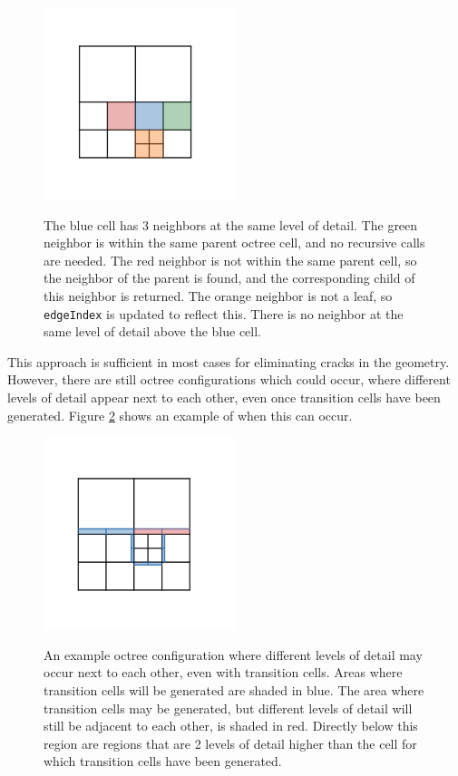 \documentclass{article}
\begin{document}
\begin{figure}
  \caption{The blue cell has 3 neighbors at the same level of detail. The green neighbor is within the same parent octree cell, and no recursive calls are needed. The red neighbor is not within the same parent cell, so the neighbor of the parent is found, and the corresponding child of this neighbor is returned. The orange neighbor is not a leaf, so \texttt{edgeIndex} is updated to reflect this. There is no neighbor at the same level of detail above the blue cell.}
  \includegraphics[width=0.5\textwidth]{octree_neighbors.png}
  \label{fig:octree_neighbors}
\end{figure}

This approach is sufficient in most cases for eliminating cracks in the geometry. However, there are still octree configurations which could occur, where different levels of detail appear next to each other, even once transition cells have been generated. Figure \ref{fig:octree_neighbor_error} shows an example of when this can occur.

\begin{figure}
  \caption{An example octree configuration where different levels of detail may occur next to each other, even with transition cells. Areas where transition cells will be generated are shaded in blue. The area where transition cells may be generated, but different levels of detail will still be adjacent to each other, is shaded in red. Directly below this region are regions that are 2 levels of detail higher than the cell for which transition cells have been generated.}
  \includegraphics[width=0.5\textwidth]{octree_neighbor_error.png}
  \label{fig:octree_neighbor_error}
\end{figure}
\end{document}
